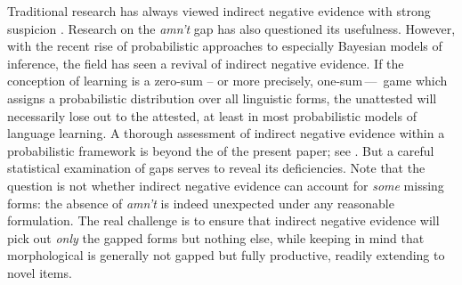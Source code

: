 \documentclass[output=paper,
modfonts
]{LSP/langsci}
\begin{document}
Traditional  research has always viewed indirect negative
evidence with strong suspicion 
\citep{Berwick1985, Osherson1986, 
  Pinker1989}. Research on the \textit{amn't} gap \citep[e.g.][]{Hudson2000} has also
questioned its usefulness. However, with the recent rise of probabilistic
approaches to  especially  Bayesian
models of inference,  the field has seen a revival of indirect negative evidence.
If the conception of learning is a zero-sum -- or more
precisely,  one-sum\,---\ game which  assigns a
probabilistic distribution over all linguistic forms,  the unattested will
necessarily lose out to the  attested, at least in most
probabilistic models of language learning. 
 A thorough assessment of indirect negative evidence within a
 probabilistic framework 
is beyond the  of the present
paper; see \citealt{Niyogi2006, Yang2015aa, Yang2017}. But 
a careful statistical examination of gaps serves to 
reveal its deficiencies.   Note that the  question is not whether
indirect negative  
evidence can account for \textit{some} missing forms: 
the absence of \textit{amn't} is indeed unexpected under any reasonable
formulation. The real challenge is to
ensure that indirect negative evidence will pick out \textit{only} the
gapped forms but nothing else, while keeping in mind that 
morphological  is generally not gapped but fully
productive, readily extending to novel items.
\end{document}
